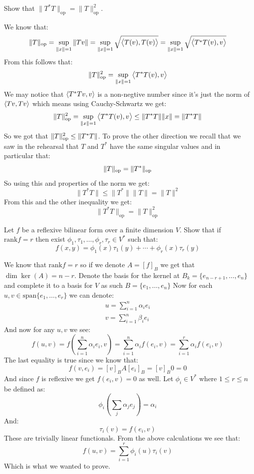 \documentclass[11pt, a4paper]{article}
\begin{document}
\begin{exercise}
  Show that $\|T^*T\|_{\text{op}} =  \|T\|_{\text{op}}^{2}$.
\end{exercise}
\begin{solution}
  We know that:
  \[
    \|T\|_{\mathrm{op}} = \sup_{\|x\|=1}{\|Tv\|} 
          = \sup_{\|x\|=1}{\sqrt{\left\langle T(v), T(v) \right\rangle}}
          = \sup_{\|x\|=1}{\sqrt{\left\langle T^*T(v), v \right\rangle}}
  \]
  From this follows that:
  \[
    \|T\|_{\operatorname{op}}^{2} = \sup_{\|x\|=1}{\left\langle T^*T(v), v \right\rangle}
  \]
  We may notice that $\left\langle T^\ast Tv, v \right\rangle$ is a non-negtive number since it's
  just the norm of $\left\langle Tv, Tv \right\rangle$ which means using Cauchy-Schwartz we get:
  \[
    \|T\|_{\operatorname{op}}^{2} = \sup_{\|x\|=1}{\left\langle T^*T(v), v \right\rangle} \le 
    \|T^\ast T\| \|x\| = \|T^\ast T\|
  \]
  So we got that $\|T\|_{\operatorname{op}}^{2} \le \|T^\ast T\|$. To prove the other
  direction we recall that we saw in the rehearsal that $T$ and $T^\ast$
  have the same singular values and in particular that:
  \[
    \|T\|_{\operatorname{op}} = \|T^\ast\|_{\operatorname{op}}
  \]
  So using this and properties of the norm we get:
  \[
    \|T^\ast T\| \le \|T^\ast\| \|T\| = \|T\|^2
  \]
  From this and the other inequality we get:
  \[
    \boxed{\|T^*T\|_{\text{op}} =  \|T\|_{\text{op}}^{2}}
  \]
\end{solution}


\begin{exercise}
  Let $f$ be a reflexive bilinear form over a finite dimension $V$.
  Show that if $\mathrm{rank}f=r$ then exist 
  $\phi_1,\tau_1,\dots,\phi_r,\tau_r\in V^*$ such that:
  \[
    f(x,y) = 
    \phi_{1}(x)\tau_{1}(y) + \cdots + \phi_{r}(x)\tau_{r}(y)
  \]
\end{exercise}
\begin{solution}
  We know that $\mathrm{rank} f = r$ so if we denote $A = [f]_B$ 
  we get that $\dim\ker(A) = n - r$. Denote the basis for the
  kernel at $B_k = \{e_{n-r+1}, \dots, e_n\}$ and complete it
  to a basis for $V$ as such $B = \{e_{1}, \dots, e_n\}$ 
  Now for each $u,v\in\mathrm{span}\{e_{1}, \dots, e_r\}$ we can 
  denote:
  \begin{align*}
    u = \sum_{i=1}^{n}{\alpha_i e_i} \\
    v = \sum_{i=1}^{n}{\beta_i e_i}
  \end{align*}
  And now for any $u,v$ we see:
  \[
    f(u,v) = f\left(\sum_{i=1}^{n}{\alpha_i e_i}, v\right) = 
    \sum_{i=1}^{n}{\alpha_i f(e_i,v)} = 
    \sum_{i=1}^{r}{\alpha_i f(e_i,v)}
  \]
  The last equality is true since we know that:
  \[
    f(v,e_i) = [v]_B A [e_i]_B = [v]_B 0 = 0
  \]
  And since $f$ is reflexive we get $f(e_i,v) = 0$ as well.
  Let $\phi_i\in V^*$ where $1 \le r \le n$ be defined as:
  \[
    \phi_i\left(\sum_{j}{\alpha_j e_j}\right) = \alpha_i
  \]
  And:
  \[
    \tau_i(v) = f(e_i,v)
  \]
  These are trivially linear functionals. From the above calculations we see that:
  \[
    f(u,v) = \sum_{i=1}^{r}{\phi_i(u)\tau_i(v)}
  \]
  Which is what we wanted to prove.
\end{solution}
\end{document}
